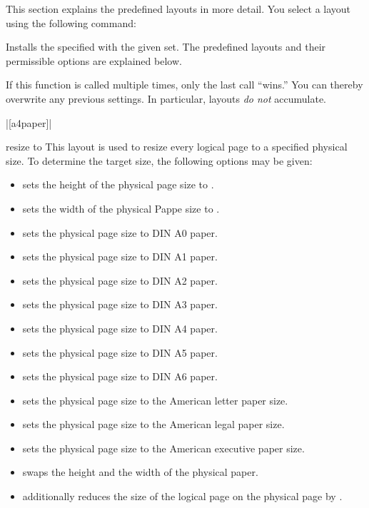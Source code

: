 This section explains the predefined layouts in more detail. You
select a layout using the following command:
\begin{command}{\pgfpagesuselayout{}}
  Installs the specified  with the given 
  set. The predefined layouts and their permissible options are
  explained below.

  If this function is called multiple times, only the last call
  ``wins.'' You can thereby overwrite any previous settings. In
  particular, layouts \emph{do not} accumulate.

  \example |[a4paper]|
\end{command}

\begin{pgflayout}{resize to}
  This layout is used to resize every logical page to a specified
  physical size. To determine the target size, the following options
  may be given:
  \begin{itemize}
  \item
     sets the
    height of the physical page size to .
  \item
     sets the
    width of the physical Pappe size to .
  \item
     sets the physical page size to DIN A0 paper.
  \item
     sets the physical page size to DIN A1 paper.
  \item
     sets the physical page size to DIN A2 paper.
  \item
     sets the physical page size to DIN A3 paper.
  \item
     sets the physical page size to DIN A4 paper.
  \item
     sets the physical page size to DIN A5 paper.
  \item
     sets the physical page size to DIN A6 paper.
  \item
     sets the physical page size to the
    American letter paper size.
  \item
     sets the physical page size to the
    American legal paper size.
  \item
     sets the physical page size to the
    American executive paper size.
  \item
     swaps the height and the width of the
    physical paper.
  \item
     additionally reduces the
    size of the logical page on the physical page by .
  \end{itemize}
\end{pgflayout}

